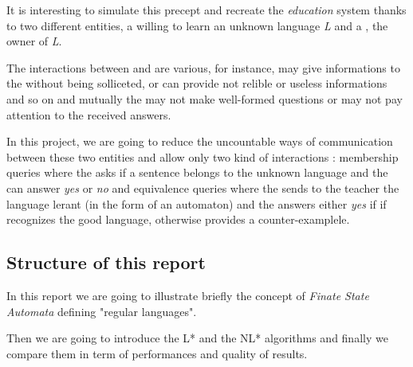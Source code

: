 It is interesting to simulate this precept and recreate the \textit{education} system thanks to two different entities, a \learner{} willing to learn an unknown language \textit{L} and a \teacher{}, the owner of \textit{L}.

The interactions between \learner{} and \teacher{} are various, for instance, \teacher{} may give informations to the \learner{} without being solliceted, or can provide not relible or useless informations and so on and mutually the \learner{} may not make well-formed questions or may not pay attention to the received answers.

In this project, we are going to reduce the uncountable ways of communication between these two entities and allow only two kind of interactions : membership queries where the \learner{} asks if a sentence belongs to the unknown language and the \teacher{} can answer \textit{yes} or \textit{no} and
equivalence queries where the \learner{} sends to the teacher the language lerant (in the form of an automaton) and the \teacher{} answers either \textit{yes} if if recognizes the good language, otherwise provides a counter-examplele.

\subsection{Structure of this report}
In this report we are going to illustrate briefly the concept of \textit{Finate State Automata} defining "regular languages".

Then we are going to introduce the L* \cite{LPaper} and the NL* \cite{NLPaper} algorithms and finally we compare them in term of performances and quality of results.